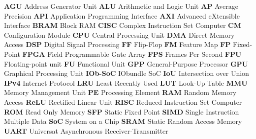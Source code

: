 \textbf{AGU} Address Generator Unit\newline
\textbf{ALU} Arithmetic and Logic Unit\newline
\textbf{AP} Average Precision\newline
\textbf{API} Application Programming Interface\newline
\textbf{AXI} Advanced eXtensible Interface \newline
\textbf{BRAM} Block RAM \newline
\textbf{CISC} Complex Instruction Set Computer \newline
\textbf{CM} Configuration Module\newline
\textbf{CPU} Central Processing Unit\newline
\textbf{DMA} Direct Memory Access\newline
\textbf{DSP} Digital Signal Processing\newline
\textbf{FF} Flip-Flop\newline
\textbf{FM} Feature Map\newline
\textbf{FP} Fixed-Point\newline
\textbf{FPGA} Field Programmable Gate Array\newline
\textbf{FPS} Frames Per Second\newline
\textbf{FPU} Floating-point unit \newline
\textbf{FU} Functional Unit\newline
\textbf{GPP} General-Purpose Processor\newline
\textbf{GPU} Graphical Processing Unit \newline
\textbf{IOb-SoC} IObundle SoC \newline
\textbf{IoU} Intersection over Union\newline
\textbf{IPv4} Internet Protocol \newline
\textbf{LRU} Least Recently Used \newline
\textbf{LUT} Look-Up Table \newline
\textbf{MMU} Memory Management Unit \newline
\textbf{PE} Processing Element\newline
\textbf{RAM} Random Memory Access\newline
\textbf{ReLU} Rectified Linear Unit \newline
\textbf{RISC} Reduced Instruction Set Computer \newline
\textbf{ROM} Read Only Memory\newline
\textbf{SFP} Static Fixed Point\newline
\textbf{SIMD} Single Instruction Multiple Data\newline
\textbf{SoC} System on a Chip\newline
\textbf{SRAM} Static Random Access Memory\newline
\textbf{UART} Universat Asynchronous Receiver-Transmitter\newline
